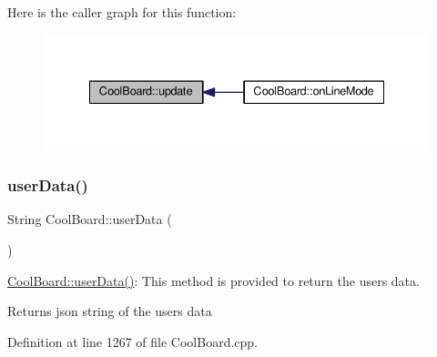 Here is the caller graph for this function\+:\nopagebreak
\begin{figure}[H]
\begin{center}
\leavevmode
\includegraphics[width=335pt]{d7/df9/class_cool_board_a8612756d3f73198cdde857a66f0fe690_icgraph}
\end{center}
\end{figure}
\mbox{\label{class_cool_board_ae7358fb6e623cfc81b775f5f1734909b}} 
\subsubsection{\texorpdfstring{user\+Data()}{userData()}}
{\footnotesize\ttfamily String Cool\+Board\+::user\+Data (\begin{DoxyParamCaption}{ }\end{DoxyParamCaption})}

\hyperlink{class_cool_board_ae7358fb6e623cfc81b775f5f1734909b}{Cool\+Board\+::user\+Data()}\+: This method is provided to return the user\textquotesingle{}s data.

\begin{DoxyReturn}{Returns}
json string of the user\textquotesingle{}s data 
\end{DoxyReturn}


Definition at line 1267 of file Cool\+Board.\+cpp.


